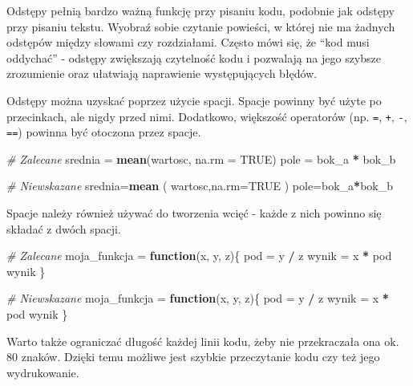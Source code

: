 \documentclass[paper=6in:9in,pagesize=pdftex,headinclude=on,footinclude=on,10pt]{scrbook}
\newenvironment{Shaded}{\begin{snugshade}}{\end{snugshade}}
\newcommand{\CommentTok}[1]{\textcolor[rgb]{0.56,0.35,0.01}{\textit{#1}}}
\newcommand{\ControlFlowTok}[1]{\textcolor[rgb]{0.13,0.29,0.53}{\textbf{#1}}}
\newcommand{\DataTypeTok}[1]{\textcolor[rgb]{0.13,0.29,0.53}{#1}}
\newcommand{\KeywordTok}[1]{\textcolor[rgb]{0.13,0.29,0.53}{\textbf{#1}}}
\newcommand{\NormalTok}[1]{#1}
\newcommand{\OperatorTok}[1]{\textcolor[rgb]{0.81,0.36,0.00}{\textbf{#1}}}
\newcommand{\OtherTok}[1]{\textcolor[rgb]{0.56,0.35,0.01}{#1}}
\newcommand{\StringTok}[1]{\textcolor[rgb]{0.31,0.60,0.02}{#1}}
\begin{document}
Odstępy pełnią bardzo ważną funkcję przy pisaniu kodu, podobnie jak odstępy przy pisaniu tekstu.
Wyobraź sobie czytanie powieści, w której nie ma żadnych odstępów między słowami czy rozdziałami.
Często mówi się, że ``kod musi oddychać'' - odstępy zwiększają czytelność kodu i pozwalają na jego szybsze zrozumienie oraz ułatwiają naprawienie występujących błędów.

Odstępy można uzyskać poprzez użycie spacji.
Spacje powinny być użyte po przecinkach, ale nigdy przed nimi.
Dodatkowo, większość operatorów (np. \texttt{=}, \texttt{+}, \texttt{-}, \texttt{==}) powinna być otoczona przez spacje.

\begin{Shaded}
\begin{Highlighting}[]
\CommentTok{# Zalecane}
\NormalTok{srednia =}\StringTok{ }\KeywordTok{mean}\NormalTok{(wartosc, }\DataTypeTok{na.rm =} \OtherTok{TRUE}\NormalTok{)}
\NormalTok{pole =}\StringTok{ }\NormalTok{bok_a }\OperatorTok{*}\StringTok{ }\NormalTok{bok_b}

\CommentTok{# Niewskazane}
\NormalTok{srednia=}\KeywordTok{mean}\NormalTok{ ( wartosc,}\DataTypeTok{na.rm=}\OtherTok{TRUE}\NormalTok{ ) }
\NormalTok{pole=bok_a}\OperatorTok{*}\NormalTok{bok_b}
\end{Highlighting}
\end{Shaded}

Spacje należy również używać do tworzenia wcięć - każde z nich powinno się składać z dwóch spacji.

\begin{Shaded}
\begin{Highlighting}[]
\CommentTok{# Zalecane}
\NormalTok{moja_funkcja =}\StringTok{ }\ControlFlowTok{function}\NormalTok{(x, y, z)\{}
\NormalTok{  pod =}\StringTok{ }\NormalTok{y }\OperatorTok{/}\StringTok{ }\NormalTok{z}
\NormalTok{  wynik =}\StringTok{ }\NormalTok{x }\OperatorTok{*}\StringTok{ }\NormalTok{pod}
\NormalTok{  wynik}
\NormalTok{\}}

\CommentTok{# Niewskazane}
\NormalTok{moja_funkcja =}\StringTok{ }\ControlFlowTok{function}\NormalTok{(x, y, z)\{}
\NormalTok{pod =}\StringTok{ }\NormalTok{y }\OperatorTok{/}\StringTok{ }\NormalTok{z}
\NormalTok{wynik =}\StringTok{ }\NormalTok{x }\OperatorTok{*}\StringTok{ }\NormalTok{pod}
\NormalTok{wynik}
\NormalTok{\}}
\end{Highlighting}
\end{Shaded}

Warto także ograniczać długość każdej linii kodu, żeby nie przekraczała ona ok. 80 znaków.
Dzięki temu możliwe jest szybkie przeczytanie kodu czy też jego wydrukowanie.
\end{document}
